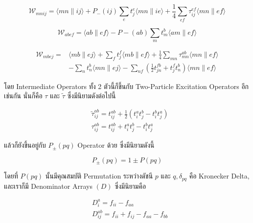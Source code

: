 \begin{equation}
  \label{eq:W_mnij}
  \mathscr{W}_{m n i j}
  = \langle m n \| i j\rangle+P_{-}(i j) \sum_e t_j^e\langle m n \| i e\rangle
  + \frac{1}{4} \sum_{e f} \tau_{i j}^{e f}\langle m n \| e f\rangle
\end{equation}

\begin{equation}
  \label{eq:W_abef}
  \mathscr{W}_{a b e f}=\langle a b \| e f\rangle-P-(a b) \sum_m t_m^b\langle a m \| e f\rangle
\end{equation}

\begin{equation}
  \label{eq:W_mbej}
  \begin{aligned}
    \mathscr{W}_{m b e j}
    =
     & \langle m b \| e j\rangle+\sum_f t_j^f\langle m b \| e f\rangle
    + \frac{1}{4} \sum_{m n} \tau_{m n}^{a b}\langle m n \| e f\rangle \\
     & - \sum_n t_n^b\langle m n \| e j\rangle
    - \sum_{n f}\left(\frac{1}{2} t_{j n}^{f b}+t_j^f t_n^b\right)\langle m n \| e f\rangle
  \end{aligned}
\end{equation}

\noindent โดย Intermediate Operators ทั้ง 2 ตัวนี้ก็ขึ้นกับ Two-Particle Excitation Operators อีกเช่นกัน นั่นก็คือ $\tau$
และ $\tilde{\tau}$ ซึ่งมีนิยามดังต่อไปนี้

\begin{align}
  \label{eq:tau_abij_tilde}
   & \tilde{\tau}_{i j}^{a b}
  =
  t_{i j}^{a b}+\frac{1}{2}\left(t_i^a t_j^b-t_i^b t_j^a\right) \\
  \label{eq:tau_abij}
   & \tau_{i j}^{a b}
  =
  t_{i j}^{a b}+t_i^a t_j^b-t_i^b t_j^a
\end{align}

\noindent แล้วก็ยังขึ้นอยู่กับ $P_{ \pm}(p q)$ Operator ด้วย ซึ่งมีนิยามดังนี้

\begin{equation}
  P_{ \pm}(p q)
  =
  1 \pm P(p q)
\end{equation}

\noindent โดยที่ $P(p q)$ นั้นมีคุณสมบัติ Permutation ระหว่างดัชนี $p$ และ $q, \delta_{p q}$ คือ Kronecker
Delta, และเราก็มี Denominator Arrays $(D)$ ซึ่งมีนิยามคือ

\begin{align}
  \label{eq:D_ai}
   & D_i^a
  =
  f_{i i}-f_{a a}  \\
  \label{eq:D_abij}
   & D_{i j}^{a b}
  =
  f_{i i}+f_{i j}-f_{a a}-f_{b b}
\end{align}

